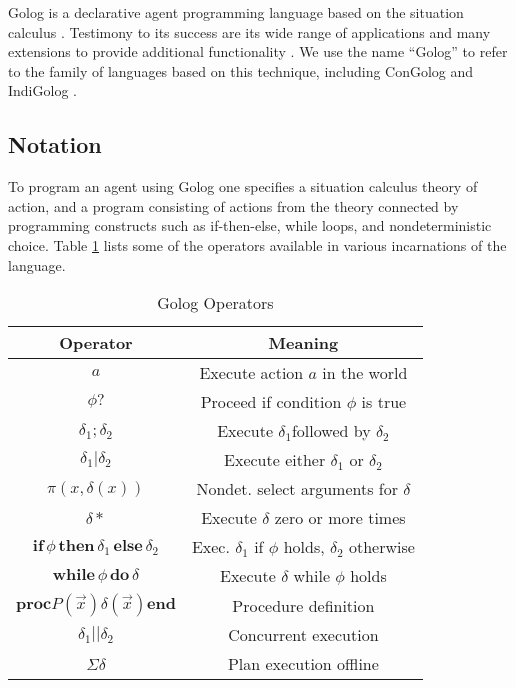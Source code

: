 Golog is a declarative agent programming language based on the situation
calculus \citep{levesque97golog}. Testimony to its success are its
wide range of applications and many extensions to provide additional
functionality \citep{giacomo00congolog,giacomo99indigolog,Ferrein2005readylog}.
We use the name {}``Golog'' to refer to the family of languages
based on this technique, including ConGolog \citep{giacomo00congolog}
and IndiGolog \citep{giacomo99indigolog}.


\subsection{Notation}

To program an agent using Golog one specifies a situation calculus
theory of action, and a program consisting of actions from the theory
connected by programming constructs such as if-then-else, while loops,
and nondeterministic choice. Table \ref{tbl:Background:Golog-Operators}
lists some of the operators available in various incarnations of the
language.%
\begin{table}[h]
\begin{centering}
\begin{tabular}{|c|c|}
\hline 
Operator  & Meaning\tabularnewline
\hline
\hline 
$a$  & Execute action $a$ in the world\tabularnewline
\hline 
$\phi?$  & Proceed if condition $\phi$ is true\tabularnewline
\hline 
$\delta_{1};\delta_{2}$  & Execute $\delta_{1}$followed by $\delta_{2}$\tabularnewline
\hline 
$\delta_{1}|\delta_{2}$  & Execute either $\delta_{1}$ or $\delta_{2}$\tabularnewline
\hline 
$\pi(x,\delta(x))$  & Nondet. select arguments for $\delta$\tabularnewline
\hline 
$\delta*$  & Execute $\delta$ zero or more times\tabularnewline
\hline 
$\mathbf{if}\,\phi\,\mathbf{then}\,\delta_{1}\,\mathbf{else}\,\delta_{2}$  & Exec. $\delta_{1}$ if $\phi$ holds, $\delta_{2}$ otherwise\tabularnewline
\hline 
$\mathbf{while\,}\phi\mathbf{\, do}\,\delta$  & Execute $\delta$ while $\phi$ holds\tabularnewline
\hline 
$\mathbf{proc}P(\overrightarrow{x})\delta(\overrightarrow{x})\mathbf{end}$  & Procedure definition\tabularnewline
\hline 
$\delta_{1}||\delta_{2}$  & Concurrent execution\tabularnewline
\hline 
$\Sigma\delta$  & Plan execution offline\tabularnewline
\hline
\end{tabular}
\par\end{centering}

\caption{Golog Operators\label{tbl:Background:Golog-Operators} }

\end{table}


